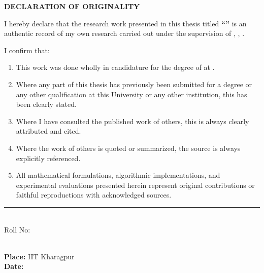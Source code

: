 \thispagestyle{plain}

\vspace{\baselineskip}

\begin{center}
{\Large {\bf \uppercase{Declaration of Originality}}}
\end{center}

\vspace{0.5\baselineskip}

\noindent
I hereby declare that the research work presented in this thesis titled \textbf{``\mytitle''} is an authentic record of my own research carried out under the supervision of \textbf{\mysupervisor}, \mydep, \myinst.

\vspace{0.5\baselineskip}

\noindent
I confirm that:
\begin{enumerate}
    \item This work was done wholly in candidature for the degree of \textbf{\mydegree} at \textbf{\myinst}.
    \item Where any part of this thesis has previously been submitted for a degree or any other qualification at this University or any other institution, this has been clearly stated.
    \item Where I have consulted the published work of others, this is always clearly attributed and cited.
    \item Where the work of others is quoted or summarized, the source is always explicitly referenced.
    \item All mathematical formulations, algorithmic implementations, and experimental evaluations presented herein represent original contributions or faithful reproductions with acknowledged sources.
\end{enumerate}

\vspace{1.5\baselineskip}

\begin{flushright}
\begin{minipage}[c]{0.5\textwidth}
\centering
\hrule 
\vspace{0.5\baselineskip}
{\large \bf \myname} \\
Roll No: \myrollno \\
\mydep \\
\myinst
\end{minipage}
\end{flushright}

\vspace{\baselineskip}
\noindent
{\large \bf Place: } IIT Kharagpur \\
{\large \bf Date: } \mydegreedate
